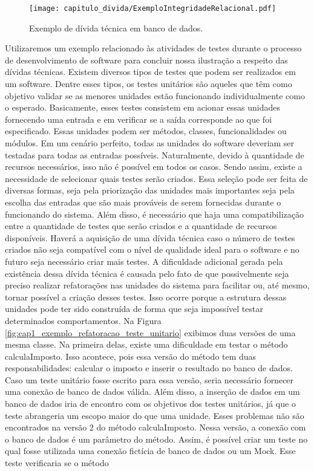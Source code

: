  \begin{figure}[!h]
  \centering
  \texttt{[image: capitulo\_divida/ExemploIntegridadeRelacional.pdf]} 
  \caption{Exemplo de dívida técnica em banco de dados. }
  \label{fig:cap1_exemplo_integridade_referencial} 
\end{figure}
 
 



Utilizaremos um exemplo relacionado às atividades de testes durante o processo de desenvolvimento de software para concluir nossa ilustração a respeito das dívidas técnicas. Existem diversos tipos de testes que podem ser realizados em um software. Dentre esses tipos, os testes unitários são aqueles que têm como objetivo validar se as menores unidades estão funcionando individualmente como o esperado\cite{cheon2002simple,runeson2006survey}. Basicamente, esses testes consistem em acionar essas unidades fornecendo uma entrada e em verificar se a saída corresponde ao que foi especificado.  Essas unidades podem ser métodos, classes, funcionalidades ou módulos. Em um cenário perfeito, todas as unidades do software deveriam ser testadas para todas as entradas possíveis. Naturalmente, devido à quantidade de recursos necessários, isso não é possível em todos os casos. Sendo assim, existe a necessidade de selecionar quais testes serão criados. Essa seleção pode ser feita de diversas formas, seja pela priorização das unidades mais importantes seja pela escolha das entradas que são mais prováveis de serem fornecidas durante o funcionando do sistema. Além disso, é necessário que haja uma compatibilização entre a quantidade de testes que serão criados e a quantidade de recursos disponíveis. Haverá a aquisição de uma dívida técnica caso o número de testes criados não seja compatível com o nível de qualidade ideal para o software e no futuro seja necessário criar mais testes. A dificuldade adicional gerada pela existência dessa dívida técnica é causada pelo fato de que possivelmente seja preciso realizar refatorações\cite{mcintosh2014impact,morales2016finding} nas unidades do sistema para facilitar ou, até mesmo, tornar possível a criação desses testes. Isso ocorre porque a estrutura dessas unidades pode ter sido construída de forma que seja impossível testar determinados comportamentos. Na Figura \ref{fig:cap1_exemplo_refatoracao_teste_unitario} exibimos duas versões de uma mesma classe. Na primeira delas, existe uma dificuldade em testar o método calculaImposto. Isso acontece, pois essa versão do método tem duas responsabilidades: calcular o imposto e inserir o resultado no banco de dados. Caso um teste unitário fosse escrito para essa versão, seria necessário fornecer uma conexão de banco de dados válida. Além disso, a inserção de dados em um banco de dados iria de encontro com os objetivos dos testes unitários, já que o teste abrangeria um escopo maior do que uma unidade. Esses problemas não são encontrados na versão 2 do método calculaImposto. Nessa versão, a conexão com o banco de dados é um parâmetro do método. Assim, é possível criar um teste no qual fosse utilizada uma conexão fictícia de banco de dados ou um Mock\cite{mackinnon2000endo,kaczanowski2012practical,acharya2014mastering}. Esse teste verificaria se o método 